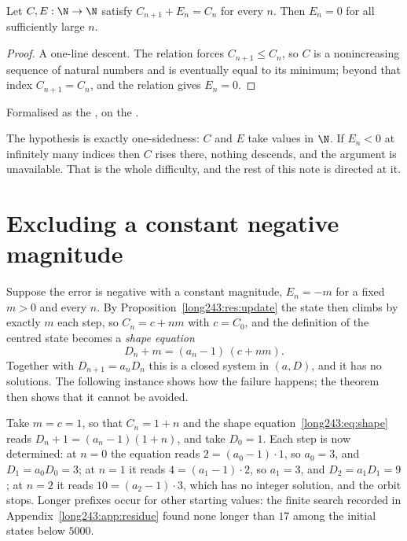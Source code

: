 \documentclass[11pt]{article}
\begin{document}
\begin{theorem}[descent]\label{long243:res:descent}
Let $C,E:\N\to\N$ satisfy $C_{n+1}+E_n=C_n$ for every $n$.  Then $E_n=0$ for
all sufficiently large $n$.
\end{theorem}

\begin{proof}
A one-line descent.  The relation forces $C_{n+1}\le C_n$, so $C$ is a nonincreasing sequence of
natural numbers and is eventually equal to its minimum; beyond that index
$C_{n+1}=C_n$, and the relation gives $E_n=0$.
\end{proof}

\noindent Formalised as the
, on the
.

The hypothesis is exactly one-sidedness: $C$ and $E$ take values in $\N$.  If
$E_n<0$ at infinitely many indices then $C$ rises there, nothing descends, and
the argument is unavailable.  That is the whole difficulty, and the rest of
this note is directed at it.

\section{Excluding a constant negative magnitude}\label{long243:sec:constant}

Suppose the error is negative with a constant magnitude, $E_n=-m$ for a fixed
$m>0$ and every $n$.  By
Proposition~\ref{long243:res:update} the state then climbs by exactly $m$ each step,
so $C_n=c+nm$ with $c=C_0$, and the definition of the centred state becomes a
\emph{shape equation}
\[
 D_n+m=(a_n-1)\,(c+nm) .
\tag{5.1}\label{long243:eq:shape}
\]
Together with $D_{n+1}=a_nD_n$ this is a closed system in $(a,D)$, and it has
no solutions.  The following instance shows how the failure happens; the
theorem then shows that it cannot be avoided.

\begin{example}\label{long243:ex:shape}
Take $m=c=1$, so that $C_n=1+n$ and the shape equation~\eqref{long243:eq:shape} reads
$D_n+1=(a_n-1)(1+n)$, and take $D_0=1$.  Each step is now determined: at $n=0$
the equation reads $2=(a_0-1)\cdot1$, so $a_0=3$, and $D_1=a_0D_0=3$; at $n=1$
it reads $4=(a_1-1)\cdot2$, so $a_1=3$, and $D_2=a_1D_1=9$; at $n=2$ it reads
$10=(a_2-1)\cdot3$, which has no integer solution, and the orbit stops.
Longer prefixes occur for other starting values: the finite search recorded in
Appendix~\ref{long243:app:residue} found none longer than $17$ among the initial
states below $5000$.
\end{example}
\end{document}
